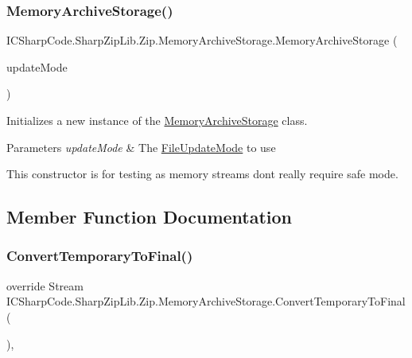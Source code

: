 \subsubsection{\texorpdfstring{Memory\+Archive\+Storage()}{MemoryArchiveStorage()}\hspace{0.1cm}{\footnotesize\ttfamily [2/2]}}
{\footnotesize\ttfamily I\+C\+Sharp\+Code.\+Sharp\+Zip\+Lib.\+Zip.\+Memory\+Archive\+Storage.\+Memory\+Archive\+Storage (\begin{DoxyParamCaption}\item[{\hyperlink{namespace_i_c_sharp_code_1_1_sharp_zip_lib_1_1_zip_a626313bc452203ca2bdb092947541027}{File\+Update\+Mode}}]{update\+Mode }\end{DoxyParamCaption})\hspace{0.3cm}{\ttfamily [inline]}}



Initializes a new instance of the \hyperlink{class_i_c_sharp_code_1_1_sharp_zip_lib_1_1_zip_1_1_memory_archive_storage}{Memory\+Archive\+Storage} class. 


\begin{DoxyParams}{Parameters}
{\em update\+Mode} & The \hyperlink{namespace_i_c_sharp_code_1_1_sharp_zip_lib_1_1_zip_a626313bc452203ca2bdb092947541027}{File\+Update\+Mode} to use\\
\hline
\end{DoxyParams}


This constructor is for testing as memory streams dont really require safe mode.

\subsection{Member Function Documentation}
\mbox{\label{class_i_c_sharp_code_1_1_sharp_zip_lib_1_1_zip_1_1_memory_archive_storage_a15c32e570f6ac74b5909cae3e22d84f4}} 
\subsubsection{\texorpdfstring{Convert\+Temporary\+To\+Final()}{ConvertTemporaryToFinal()}}
{\footnotesize\ttfamily override Stream I\+C\+Sharp\+Code.\+Sharp\+Zip\+Lib.\+Zip.\+Memory\+Archive\+Storage.\+Convert\+Temporary\+To\+Final (\begin{DoxyParamCaption}{ }\end{DoxyParamCaption})\hspace{0.3cm}{\ttfamily [inline]}, {\ttfamily [virtual]}}



